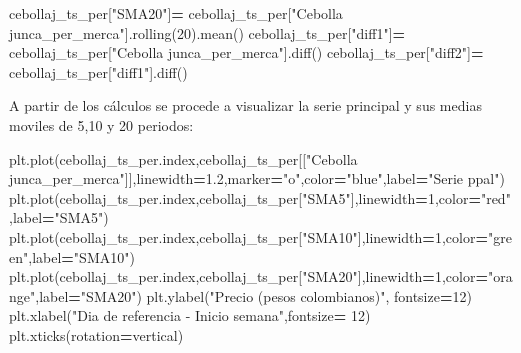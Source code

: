 \documentclass[
]{book}
\newenvironment{Shaded}{\begin{snugshade}}{\end{snugshade}}
\newcommand{\DecValTok}[1]{\textcolor[rgb]{0.00,0.00,0.81}{#1}}
\newcommand{\FloatTok}[1]{\textcolor[rgb]{0.00,0.00,0.81}{#1}}
\newcommand{\NormalTok}[1]{#1}
\newcommand{\OperatorTok}[1]{\textcolor[rgb]{0.81,0.36,0.00}{\textbf{#1}}}
\newcommand{\StringTok}[1]{\textcolor[rgb]{0.31,0.60,0.02}{#1}}
\begin{document}
\begin{Shaded}
\begin{Highlighting}[]
\NormalTok{cebollaj\_ts\_per[}\StringTok{"SMA20"}\NormalTok{]}\OperatorTok{=}\NormalTok{ cebollaj\_ts\_per[}\StringTok{"Cebolla junca\_per\_merca"}\NormalTok{].rolling(}\DecValTok{20}\NormalTok{).mean()}
\NormalTok{cebollaj\_ts\_per[}\StringTok{"diff1"}\NormalTok{]}\OperatorTok{=}\NormalTok{ cebollaj\_ts\_per[}\StringTok{"Cebolla junca\_per\_merca"}\NormalTok{].diff()}
\NormalTok{cebollaj\_ts\_per[}\StringTok{"diff2"}\NormalTok{]}\OperatorTok{=}\NormalTok{ cebollaj\_ts\_per[}\StringTok{"diff1"}\NormalTok{].diff()}
\end{Highlighting}
\end{Shaded}

A partir de los cálculos se procede a visualizar la serie principal y sus medias moviles de 5,10 y 20 periodos:

\begin{Shaded}
\begin{Highlighting}[]

\NormalTok{plt.plot(cebollaj\_ts\_per.index,cebollaj\_ts\_per[[}\StringTok{"Cebolla junca\_per\_merca"}\NormalTok{]],linewidth}\OperatorTok{=}\FloatTok{1.2}\NormalTok{,marker}\OperatorTok{=}\StringTok{"o"}\NormalTok{,color}\OperatorTok{=}\StringTok{"blue"}\NormalTok{,label}\OperatorTok{=}\StringTok{"Serie ppal"}\NormalTok{)}
\NormalTok{plt.plot(cebollaj\_ts\_per.index,cebollaj\_ts\_per[}\StringTok{"SMA5"}\NormalTok{],linewidth}\OperatorTok{=}\DecValTok{1}\NormalTok{,color}\OperatorTok{=}\StringTok{"red"}\NormalTok{,label}\OperatorTok{=}\StringTok{"SMA5"}\NormalTok{)}
\NormalTok{plt.plot(cebollaj\_ts\_per.index,cebollaj\_ts\_per[}\StringTok{"SMA10"}\NormalTok{],linewidth}\OperatorTok{=}\DecValTok{1}\NormalTok{,color}\OperatorTok{=}\StringTok{"green"}\NormalTok{,label}\OperatorTok{=}\StringTok{"SMA10"}\NormalTok{)}
\NormalTok{plt.plot(cebollaj\_ts\_per.index,cebollaj\_ts\_per[}\StringTok{"SMA20"}\NormalTok{],linewidth}\OperatorTok{=}\DecValTok{1}\NormalTok{,color}\OperatorTok{=}\StringTok{"orange"}\NormalTok{,label}\OperatorTok{=}\StringTok{"SMA20"}\NormalTok{)}
\NormalTok{plt.ylabel(}\StringTok{"Precio (pesos colombianos)"}\NormalTok{, fontsize}\OperatorTok{=}\DecValTok{12}\NormalTok{)}
\NormalTok{plt.xlabel(}\StringTok{"Dia de referencia {-} Inicio semana"}\NormalTok{,fontsize}\OperatorTok{=} \DecValTok{12}\NormalTok{)}
\NormalTok{plt.xticks(rotation}\OperatorTok{=}\StringTok{\textquotesingle{}vertical\textquotesingle{}}\NormalTok{)}
\end{Highlighting}
\end{Shaded}
\end{document}
